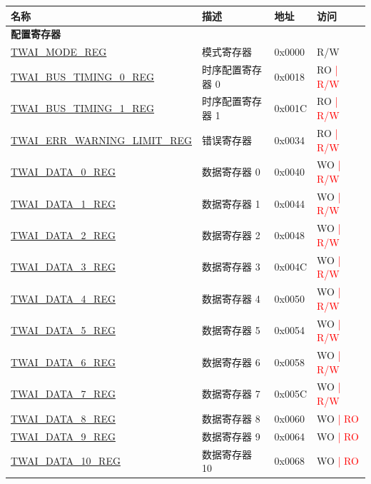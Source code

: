 \begin{longtable}{ | p{6cm} | p{6cm} | p{1.3cm} | p{2cm} | }
\hline\rowcolor{lightgray}
名称 & 描述 &  地址 & 访问 \\ \hline
\endhead
\multicolumn{4}{|l|}{\textbf{配置寄存器}} \\ \hline
\hyperref[regdesc:TWAIMODEREG]{TWAI\_MODE\_REG} & 模式寄存器 & 0x0000 & R/W \\ \hline
\hyperref[regdesc:TWAIBUSTIMING0REG]{TWAI\_BUS\_TIMING\_0\_REG} & 时序配置寄存器 0 & 0x0018 & RO \textcolor{red}{| R/W} \\ \hline
\hyperref[regdesc:TWAIBUSTIMING1REG]{TWAI\_BUS\_TIMING\_1\_REG} & 时序配置寄存器 1 & 0x001C & RO \textcolor{red}{| R/W} \\ \hline
\hyperref[regdesc:TWAIERRWARNINGLIMITREG]{TWAI\_ERR\_WARNING\_LIMIT\_REG} & 错误寄存器 & 0x0034 & RO \textcolor{red}{| R/W} \\ \hline
\hyperref[regdesc:TWAIDATA0REG]{TWAI\_DATA\_0\_REG} & 数据寄存器 0 & 0x0040 & WO \textcolor{red}{| R/W} \\ \hline
\hyperref[regdesc:TWAIDATA1REG]{TWAI\_DATA\_1\_REG} & 数据寄存器 1 & 0x0044 & WO \textcolor{red}{| R/W} \\ \hline
\hyperref[regdesc:TWAIDATA2REG]{TWAI\_DATA\_2\_REG} & 数据寄存器 2 & 0x0048 & WO \textcolor{red}{| R/W} \\ \hline
\hyperref[regdesc:TWAIDATA3REG]{TWAI\_DATA\_3\_REG} & 数据寄存器 3 & 0x004C & WO \textcolor{red}{| R/W} \\ \hline
\hyperref[regdesc:TWAIDATA4REG]{TWAI\_DATA\_4\_REG} & 数据寄存器 4 & 0x0050 & WO \textcolor{red}{| R/W} \\ \hline
\hyperref[regdesc:TWAIDATA5REG]{TWAI\_DATA\_5\_REG} & 数据寄存器 5 & 0x0054 & WO \textcolor{red}{| R/W} \\ \hline
\hyperref[regdesc:TWAIDATA6REG]{TWAI\_DATA\_6\_REG} & 数据寄存器 6 & 0x0058 & WO \textcolor{red}{| R/W} \\ \hline
\hyperref[regdesc:TWAIDATA7REG]{TWAI\_DATA\_7\_REG} & 数据寄存器 7 & 0x005C & WO \textcolor{red}{| R/W} \\ \hline
\hyperref[regdesc:TWAIDATA8REG]{TWAI\_DATA\_8\_REG} & 数据寄存器 8 & 0x0060 & WO \textcolor{red}{| RO} \\ \hline
\hyperref[regdesc:TWAIDATA9REG]{TWAI\_DATA\_9\_REG} & 数据寄存器 9 & 0x0064 & WO \textcolor{red}{| RO} \\ \hline
\hyperref[regdesc:TWAIDATA10REG]{TWAI\_DATA\_10\_REG} & 数据寄存器 10 & 0x0068 & WO \textcolor{red}{| RO} \\ \hline

\end{longtable}

